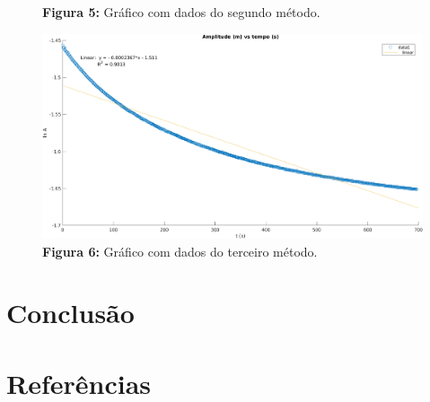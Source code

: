 \documentclass[a4paper, 12pt]{article}
\begin{document}
\begin{multicols}{2}
\begin{figure}[H]
				\captionsetup{labelformat=empty}
				\caption{\textbf{Figura 5:} Gráfico com dados do segundo método.}
			\end{figure}
			\begin{figure}[H] \label{img:m3}
				\centering
				\includegraphics[scale=0.3]{./img/m3.png}
				\captionsetup{labelformat=empty}
				\caption{\textbf{Figura 6:} Gráfico com dados do terceiro método.}
			\end{figure}
			
		\section{Conclusão} \label{sec:conclusao}
		
		\section{Referências}
		
	\end{multicols}
\end{document}
